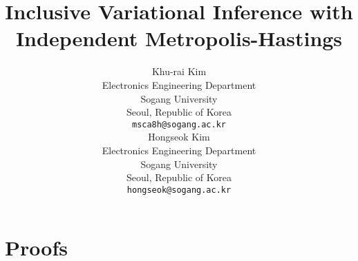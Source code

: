 \documentclass{article}
\title{Inclusive Variational Inference with \\ Independent Metropolis-Hastings}
\author{%
  Khu-rai Kim \\
  Electronics Engineering Department \\
  Sogang University\\
  Seoul, Republic of Korea \\
  \texttt{msca8h@sogang.ac.kr} \\
  \And
  Hongseok Kim \\
  Electronics Engineering Department \\
  Sogang University\\
  Seoul, Republic of Korea \\
  \texttt{hongseok@sogang.ac.kr} \\
}
\begin{document}
\maketitle

\begin{abstract}
  
\end{abstract}







\newpage





\newpage
\appendix
\section{Proofs}
\printProofs
\end{document}
